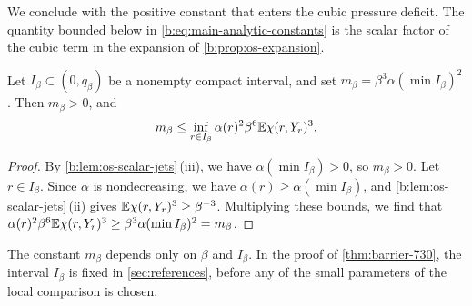 We conclude with the positive constant that enters the cubic pressure
deficit. The quantity bounded below in \eqref{b:eq:main-analytic-constants} is
the scalar factor of the cubic term in the expansion of
\cref{b:prop:os-expansion}.

\begin{corollary}\label{cor:sc-mbeta}
Let $I_\beta\subset(0,q_\beta)$ be a nonempty compact interval, and set
$m_\beta=\beta^3\alpha(\min I_\beta)^2$. Then $m_\beta>0$, and
\begin{equation}\label{b:eq:main-analytic-constants}
 m_\beta\le\inf_{r\in I_\beta}\alpha(r)^2\beta^6\mathbb E\chi(r,Y_r)^3.
\end{equation}
\end{corollary}

\begin{proof}
By \cref{b:lem:os-scalar-jets}\,(iii), we have $\alpha(\min I_\beta)>0$, so
$m_\beta>0$. Let $r\in I_\beta$. Since $\alpha$ is nondecreasing, we have
$\alpha(r)\ge\alpha(\min I_\beta)$, and \cref{b:lem:os-scalar-jets}\,(ii)
gives $\mathbb E\chi(r,Y_r)^3\ge\beta^{-3}$. Multiplying these bounds, we find that
$\alpha(r)^2\beta^6\mathbb E\chi(r,Y_r)^3\ge\beta^3\alpha(\min I_\beta)^2=m_\beta$.
\end{proof}

The constant $m_\beta$ depends only on $\beta$ and $I_\beta$. In the proof of
\cref{thm:barrier-730}, the interval $I_\beta$ is fixed in \cref{sec:references},
before any of the small parameters of the local comparison is chosen.
